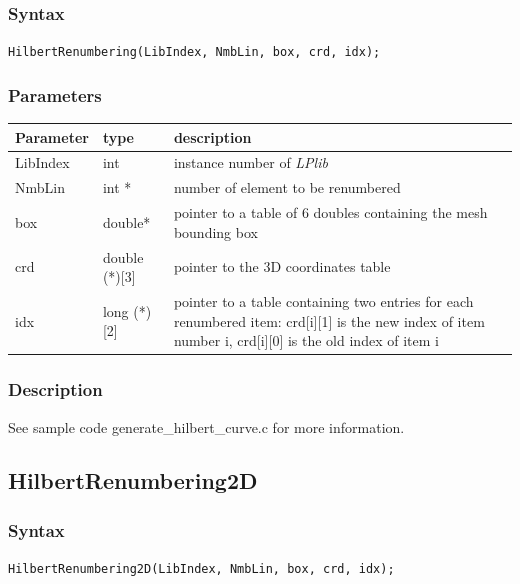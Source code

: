 \documentclass[a4paper,12pt]{article}
\begin{document}
\subsubsection*{Syntax}
\tt{HilbertRenumbering(LibIndex, NmbLin, box, crd, idx);}
\normalfont

\subsubsection*{Parameters}
\begin{tabular}{|m{2cm}|m{3cm}|m{8cm}|}
\hline
Parameter  & type   & description \\
\hline
LibIndex   & int    & instance number of \emph{LPlib} \\
\hline
NmbLin     & int * & number of element to be renumbered \\
\hline
box        & double* & pointer to a table of 6 doubles containing the mesh bounding box \\
\hline
crd        & double (*)[3] & pointer to the 3D coordinates table \\
\hline
idx        & long (*)[2] & pointer to a table containing two entries for each renumbered item: crd[i][1] is the new index of item number i, crd[i][0] is the old index of item i \\
\hline
\end{tabular}

\subsubsection*{Description}
See sample code generate\_hilbert\_curve.c for more information.


\subsection{HilbertRenumbering2D}

\subsubsection*{Syntax}
\tt{HilbertRenumbering2D(LibIndex, NmbLin, box, crd, idx);}
\normalfont
\end{document}
